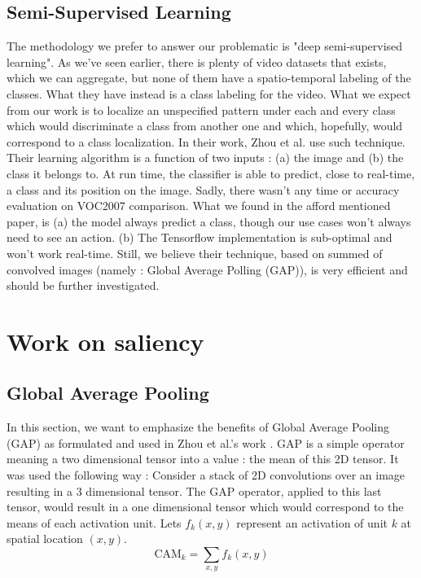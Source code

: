 		\subsection{Semi-Supervised Learning}
		\label{sub:semi_supervised_learning}
			The methodology we prefer to answer our problematic is "deep semi-supervised learning". As we've seen earlier, there is plenty of video datasets that exists, which we can aggregate, but none of them have a spatio-temporal labeling of the classes. What they have instead is a class labeling for the video. What we expect from our work is to localize an unspecified pattern under each and every class which would discriminate a class from another one and which, hopefully, would correspond to a class localization. In their work, Zhou et al. \cite{zhou2015learning} use such technique. Their learning algorithm is a function of two inputs : (a) the image and (b) the class it belongs to. At run time, the classifier is able to predict, close to real-time, a class and its position on the image. Sadly, there wasn't any time or accuracy evaluation on VOC2007 comparison. 
			What we found in the afford mentioned paper, is (a) the model always predict a class, though our use cases won't always need to see an action. (b) The Tensorflow implementation is sub-optimal and won't work real-time. Still, we believe their technique, based on summed of convolved images (namely : Global Average Polling (GAP)), is very efficient and should be further investigated.


	
	\section{Work on saliency}
	\label{sec:work_on_saliency}

		\subsection{Global Average Pooling}
		\label{sub:global_average_pooling}
			In this section, we want to emphasize the benefits of Global Average Pooling (GAP) as formulated and used in Zhou et al.'s work \cite{zhou2015learning}. GAP is a simple operator meaning a two dimensional tensor into a value : the mean of this 2D tensor. It was used the following way : Consider a stack of 2D convolutions over an image resulting in a 3 dimensional tensor. The GAP operator, applied to this last tensor, would result in a one dimensional tensor which would correspond to the means of each activation unit. Lets $f_k(x,y)$ represent an activation of unit $k$ at spatial location $(x,y)$.
			\begin{equation}
				\text{CAM}_k = \sum_{x,y}f_k(x,y)
			\end{equation}

